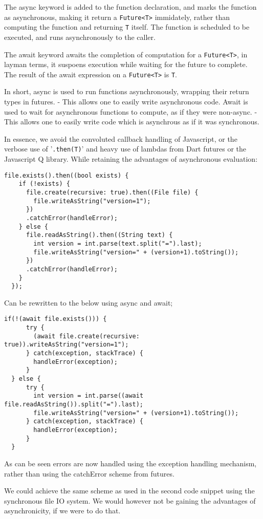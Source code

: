 The async keyword is added to the function declaration, and marks the function as asynchronous, making it return a \verb|Future<T>| immidately, rather than computing the function and returning \verb|T| itself.
The function is scheduled to be executed, and runs asynchronously to the caller.

The await keyword awaits the completion of computation for a \verb|Future<T>|, in layman terms, it suspoens execution while waiting for the future to complete.
The result of the await expression on a \verb|Future<T>| is \verb|T|.

In short, async is used to run functions asynchronously, wrapping their return types in futures. - This allows one to easily write asynchronous code.
Await is used to wait for asynchronous functions to compute, as if they were non-async. - This allows one to easily write code which is asynchrous as if it was synchronous. 

In essence, we avoid the convoluted callback handling of Javascript, or the verbose use of '\verb|.then(T)|' and heavy use of lambdas from Dart futures or the Javascript Q library. While retaining the advantages of asynchronous evaluation:
\begin{verbatim}
file.exists().then((bool exists) {
    if (!exists) {
      file.create(recursive: true).then((File file) {
        file.writeAsString("version=1");
      })
      .catchError(handleError);
    } else {
      file.readAsString().then((String text) {
        int version = int.parse(text.split("=").last);
        file.writeAsString("version=" + (version+1).toString());
      })
      .catchError(handleError);
    }
  });
\end{verbatim}
Can be rewritten to the below using async and await;
\begin{verbatim}
if(!(await file.exists())) {
      try {
        (await file.create(recursive: true)).writeAsString("version=1");
      } catch(exception, stackTrace) {
        handleError(exception);
      }
  } else {
      try {
        int version = int.parse((await file.readAsString()).split("=").last);
        file.writeAsString("version=" + (version+1).toString());
      } catch(exception, stackTrace) {
        handleError(exception);
      }
  }
\end{verbatim}
As can be seen errors are now handled using the exception handling mechanism, rather than using the catchError scheme from futures.

We could achieve the same scheme as used in the second code snippet using the synchronous file IO system.
We would however not be gaining the advantages of asynchronicity, if we were to do that.
